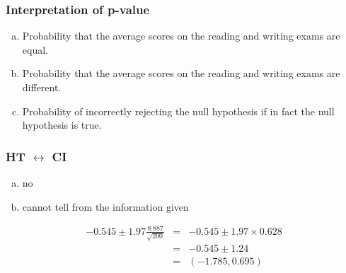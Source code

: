 \documentclass[slidestop,compress,mathserif]{beamer}
\newcommand{\soln}[1]{\textit{#1}}
\begin{document}

\begin{frame}
\frametitle{Interpretation of p-value}


\begin{enumerate}[(a)]
\item Probability that the average scores on the reading and writing exams are equal.
\item Probability that the average scores on the reading and writing exams are different.
\item Probability of incorrectly rejecting the null hypothesis if in fact the null hypothesis is true.
\end{enumerate}

\end{frame}


\begin{frame}
\frametitle{HT $\leftrightarrow$ CI}


\begin{enumerate}[(a)]
\item no
\item cannot tell from the information given
\end{enumerate}

\soln{\pause
\begin{eqnarray*} 
-0.545 \pm 1.97 \frac{8.887}{\sqrt{200}} &=& -0.545 \pm 1.97 \times 0.628 \\
&=& -0.545 \pm 1.24 \\
&=& (-1.785, 0.695)
\end{eqnarray*}
}

\end{frame}


\end{document}
